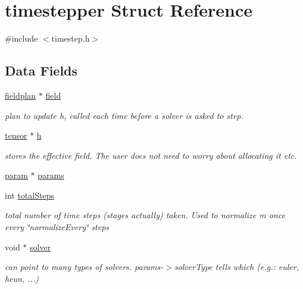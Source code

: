 \hypertarget{structtimestepper}{
\section{timestepper Struct Reference}
\label{structtimestepper}
}


{\ttfamily \#include $<$timestep.h$>$}

\subsection*{Data Fields}
\begin{DoxyCompactItemize}
\item 
\hyperlink{structfieldplan}{fieldplan} $\ast$ \hyperlink{structtimestepper_aa1e5fa1167a21b8377d1693b3ea5ffd4}{field}
\begin{DoxyCompactList}\small\item\em plan to update h, called each time before a solver is asked to step. \item\end{DoxyCompactList}\item 
\hyperlink{structtensor}{tensor} $\ast$ \hyperlink{structtimestepper_a2b1cb6aeb25f878d17475c6ef2a47865}{h}
\begin{DoxyCompactList}\small\item\em stores the effective field. The user does not need to worry about allocating it etc. \item\end{DoxyCompactList}\item 
\hyperlink{structparam}{param} $\ast$ \hyperlink{structtimestepper_a4722c7e9d91a24dd54fda2618150e3ca}{params}
\item 
int \hyperlink{structtimestepper_ae00738ade828402f52973bddb26ad0ec}{totalSteps}
\begin{DoxyCompactList}\small\item\em total number of time steps (stages actually) taken. Used to normalize m once every \char`\"{}normalizeEvery\char`\"{} steps \item\end{DoxyCompactList}\item 
void $\ast$ \hyperlink{structtimestepper_a1f105a14fa99654f504e62ea0e565f13}{solver}
\begin{DoxyCompactList}\small\item\em can point to many types of solvers. params-\/$>$solverType tells which (e.g.: euler, heun, ...) \item\end{DoxyCompactList}\end{DoxyCompactItemize}



